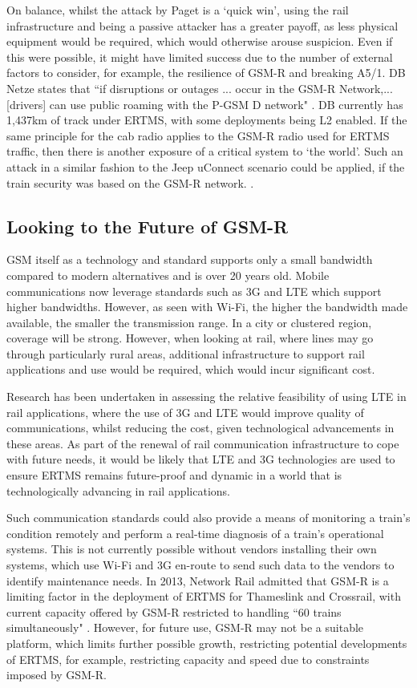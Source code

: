 \documentclass[twoside,11pt,a4paper]{article}
\begin{document}
On balance, whilst the attack by Paget is a `quick win', using the rail infrastructure and being a passive attacker has a greater payoff, as less physical equipment would be required, which would otherwise arouse suspicion. Even if this were possible, it might have limited success due to the number of external factors to consider, for example, the resilience of GSM-R and breaking A5/1. DB Netze states that ``if disruptions or outages ... occur in the GSM-R Network,... [drivers] can use public roaming with the P-GSM D network" \citep{DBNetze12a}. DB currently has 1,437km \citep{UNIFE15a} of track under ERTMS, with some deployments being L2 enabled. If the same principle for the cab radio applies to the GSM-R radio used for ERTMS traffic, then there is another exposure of a critical system to `the world'. Such an attack in a similar fashion to the Jeep uConnect scenario could be applied, if the train security was based on the GSM-R network. \citep{uconnect15a}.

\subsection{Looking to the Future of GSM-R}
GSM itself as a technology and standard supports only a small bandwidth compared to modern alternatives \citep{RailEngineer13b} and is over 20 years old. Mobile communications now leverage standards such as 3G and LTE which support higher bandwidths. However, as seen with Wi-Fi, the higher the bandwidth made available, the smaller the transmission range. In a city or clustered region, coverage will be strong. However, when looking at rail, where lines may go through particularly rural areas, additional infrastructure to support rail applications and use would be required, which would incur significant cost.

Research has been undertaken in assessing the relative feasibility of using LTE in rail applications, where the use of 3G and LTE would improve quality of communications, whilst reducing the cost, given technological advancements in these areas. As part of the renewal of rail communication infrastructure to cope with future needs, it would be likely that LTE and 3G technologies are used to ensure ERTMS remains future-proof and dynamic in a world that is technologically advancing in rail applications.

Such communication standards could also provide a means of monitoring a train's condition remotely and perform a real-time diagnosis of a train's operational systems. This is not currently possible without vendors installing their own systems, which use Wi-Fi and 3G en-route to send such data to the vendors to identify maintenance needs. In 2013, Network Rail admitted that GSM-R is a limiting factor in the deployment of ERTMS for Thameslink and Crossrail, with current capacity offered by GSM-R restricted to handling ``60 trains simultaneously" \citep{FT13a}. However, for future use, GSM-R may not be a suitable platform, which limits further possible growth, restricting potential developments of ERTMS, for example, restricting capacity and speed due to constraints imposed by GSM-R.
\end{document}
